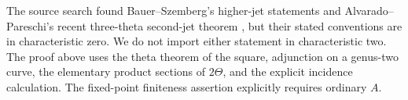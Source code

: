 \begin{remark}\label{auto:A_ppav_two_jets:0557c5a87cfe}

The source search found Bauer--Szemberg's higher-jet statements
\cite[Theorems~1 and~2, conventions p.~2]{BauerSzemberg1997}
and Alvarado--Pareschi's recent three-theta second-jet theorem
\cite[Theorem~D; Section~2 conventions]{AlvaradoPareschi2026},
but their stated conventions are in characteristic zero. We do
not import either statement in characteristic two. The proof
above uses the theta theorem of the square, adjunction on a
genus-two curve, the elementary product sections of $2\Theta$,
and the explicit incidence calculation. The fixed-point finiteness
assertion explicitly requires ordinary $A$.
\end{remark}
